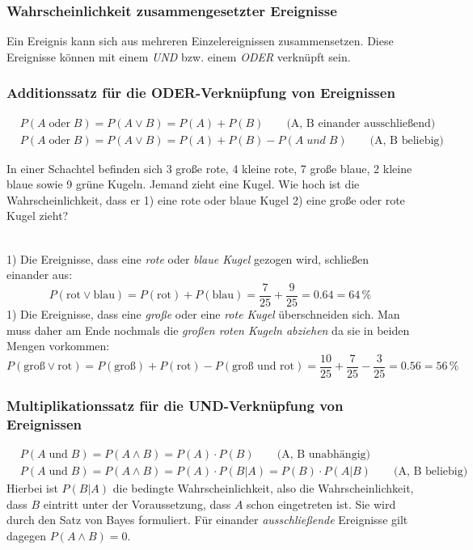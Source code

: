 \subsubsection{Wahrscheinlichkeit zusammengesetzter Ereignisse}
Ein Ereignis kann sich aus mehreren Einzelereignissen zusammensetzen. Diese Ereignisse können mit einem \emph{UND} bzw. einem \emph{ODER} verknüpft sein.
\\
\subsubsection*{Additionssatz für die ODER-Verknüpfung von Ereignissen}
\begin{align}
    &P(A\;\mathrm{oder}\;B)=P(A\lor B) = P(A) + P(B) \qquad \text{(A, B einander ausschließend)} \\
    &P(A\;\mathrm{oder}\;B)=P(A\lor B) = P(A) + P(B) - P(A\;und\;B) \qquad \text{(A, B beliebig)}
\end{align}
\vspace{-10pt}
\begin{aufgabe}
    In einer Schachtel befinden sich 3 große rote, 4 kleine rote, 7 große blaue, 2 kleine blaue sowie 9 grüne Kugeln. Jemand zieht eine Kugel. Wie hoch ist die Wahrscheinlichkeit, dass er 1) eine rote oder blaue Kugel 2) eine große oder rote Kugel zieht?
\end{aufgabe}
\begin{loesung} \\
    1) Die Ereignisse, dass eine \emph{rote} oder \emph{blaue Kugel} gezogen wird, schließen einander aus:
    \[
        P(\text{rot} \lor \text{blau}) = P(\text{rot}) + P(\text{blau}) = 
            \frac{7}{25} + \frac{9}{25} = 0.64 = 64\,\%
    \]
    1) Die Ereignisse, dass eine \emph{große} oder eine \emph{rote Kugel} überschneiden sich. Man muss daher am Ende nochmals die \emph{großen roten Kugeln abziehen} da sie in beiden Mengen vorkommen:
    \[
        P(\text{groß} \lor \text{rot}) = P(\text{groß}) + P(\text{rot}) - P(\text{groß und rot}) = 
            \frac{10}{25} + \frac{7}{25} - \frac{3}{25} = 0.56 = 56\,\%
    \]
\end{loesung}

\subsubsection*{Multiplikationssatz für die UND-Verknüpfung von Ereignissen}
\begin{align}
    &P(A\;\mathrm{und}\;B)=P(A\land B) = P(A) \cdot P(B) \qquad \text{(A, B unabhängig)} \\
    &P(A\;\mathrm{und}\;B)=P(A\land B) = P(A) \cdot P(B|A) = P(B) \cdot P(A|B) \qquad \text{(A, B beliebig)}
\end{align}
Hierbei ist $P(B|A)$ die bedingte Wahrscheinlichkeit, also die Wahrscheinlichkeit, dass $B$ eintritt unter der Voraussetzung, dass $A$ schon eingetreten ist. Sie wird durch den Satz von Bayes formuliert. Für einander \emph{ausschließende} Ereignisse gilt dagegen $P(A \land B) = 0$.
